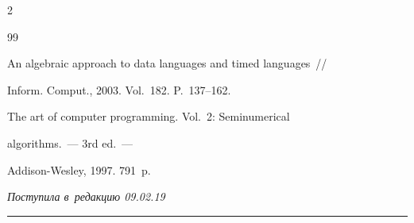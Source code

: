 \begin{multicols}{2}
{{\begin{thebibliography}{99}




An algebraic approach to data languages and timed languages~//


Inform. Comput., 2003. Vol.~182. P.~137--162.












The art of computer programming. Vol.~2: Seminumerical


  algorithms.~--- 3rd ed.~---


Addison-Wesley, 1997. 791~p.





 \end{thebibliography}





 }


 }





\end{multicols}





\vspace*{-3pt}





\hfill{\small\textit{Поступила в~редакцию 09.02.19}}





\vspace*{8pt}




















\hrule





\vspace*{2pt}





